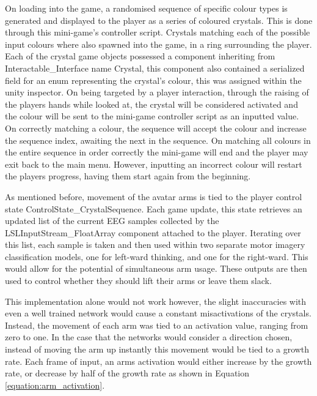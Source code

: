 \documentclass[11pt, a4paper]{article}
\newcommand{\refequation}[1]{Equation \ref{#1}}
\begin{document}
\hfill

On loading into the game, a randomised sequence of specific colour types is generated and displayed to the player as a series of coloured crystals. This is done through this mini-game's controller script. Crystals matching each of the possible input colours where also spawned into the game, in a ring surrounding the player. Each of the crystal game objects possessed a component inheriting from Interactable\_Interface name Crystal, this component also contained a serialized field for an enum representing the crystal's colour, this was assigned within the unity inspector. On being targeted by a player interaction, through the raising of the players hands while looked at, the crystal will be considered activated and the colour will be sent to the mini-game controller script as an inputted value. On correctly matching a colour, the sequence will accept the colour and increase the sequence index, awaiting the next in the sequence. On matching all colours in the entire sequence in order correctly the mini-game will end and the player may exit back to the main menu. However, inputting an incorrect colour will restart the players progress, having them start again from the beginning.

\hfill

As mentioned before, movement of the avatar arms is tied to the player control state ControlState\_CrystalSequence. Each game update, this state retrieves an updated list of the current EEG samples collected by the LSLInputStream\_FloatArray component attached to the player. Iterating over this list, each sample is taken and then used within two separate motor imagery classification models, one for left-ward thinking, and one for the right-ward. This would allow for the potential of simultaneous arm usage. These outputs are then used to control whether they should lift their arms or leave them slack. 

\pagebreak

This implementation alone would not work however, the slight inaccuracies with even a well trained network would cause a constant misactivations of the crystals. Instead, the movement of each arm was tied to an activation value, ranging from zero to one. In the case that the networks would consider a direction chosen, instead of moving the arm up instantly this movement would be tied to a growth rate. Each frame of input, an arms activation would either increase by the growth rate, or decrease by half of the growth rate as shown in \refequation{equation:arm_activation}. 
\end{document}

